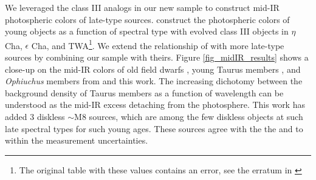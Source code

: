 \documentclass[12pt,preprint]{aastex}
\begin{document}
We leveraged the class III analogs in our new sample to construct mid-IR photospheric colors of late-type sources.  \citet{2010ApJS..186..111L} construct the photospheric colors of young objects as a function of spectral type with evolved class III objects in $\eta$ Cha, $\epsilon$ Cha, and TWA\footnote{The original table with these values contains an error, see the erratum in \cite{2010ApJS..189..353L}}.  We extend the relationship of \citet{2010ApJS..186..111L} with more late-type sources by combining our sample with theirs.  Figure \ref{fig_midIR_results} shows a close-up on the mid-IR colors of old field dwarfs \citep{2006ApJ...651..502P}, young Taurus members \citep{2010ApJS..186..111L}, and \emph{Ophiuchus} members from \citep{allers06} and this work.  The increasing dichotomy between the background density of Taurus members as a function of wavelength can be understood as the mid-IR excess detaching from the photosphere.  This work has added 3 diskless $\sim$M8 sources, which are among the few diskless objects at such late spectral types for such young ages.  These sources agree with the the \citet{2006ApJ...651..502P} and \citep{2010ApJS..186..111L} to within the measurement uncertainties.
\end{document}
